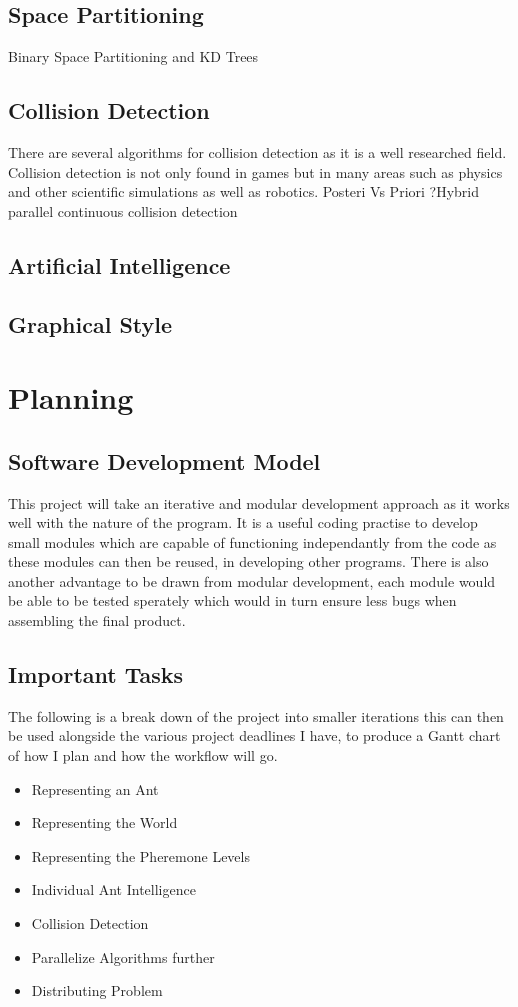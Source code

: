 \documentclass{report}
\begin{document}
\section {Space Partitioning}
Binary Space Partitioning and KD Trees
\section{Collision Detection}
There are several algorithms for collision detection as it is a well researched field. Collision detection is not only found in games but in many areas such as physics and other scientific simulations as well as robotics.
Posteri Vs Priori
?Hybrid parallel continuous collision detection
\section{Artificial Intelligence} 

\section{Graphical Style}


\chapter{Planning}


\section{Software Development Model}
This project will take an iterative and modular development approach as it works well with the nature of the program. It is a useful coding practise to develop small modules which are capable of functioning independantly from the code as these modules can then be reused, in developing other programs. There is also another advantage to be drawn from modular development, each module would be able to be tested sperately which would in turn ensure less bugs when assembling the final product.

\section{Important Tasks}
The following is a break down of the project into smaller iterations this can then be used alongside the various project deadlines I have, to produce a Gantt chart of how I plan and how the workflow will go.
\begin{itemize}
	\item Representing an Ant
	\item Representing the World
	\item Representing the Pheremone Levels
	\item Individual Ant Intelligence
	\item Collision Detection
	\item Parallelize Algorithms further
	\item Distributing Problem
\end{itemize}
\end{document}
